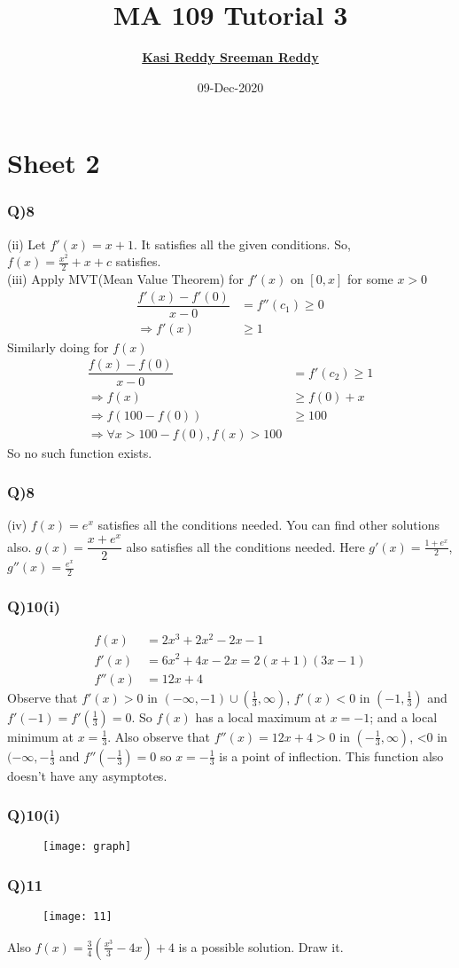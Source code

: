 \documentclass[11pt]{beamer}
\author[K. Sreeman Reddy]{\href{http://iamsreeman.github.io/}{\textbf{Kasi Reddy Sreeman Reddy}}\linebreak\text{2nd year physics student}\linebreak\text{\href{http://iamsreeman.github.io/MA109}{http://iamsreeman.github.io/MA109}}}
\title{MA 109 Tutorial 3}
\institute[]{IIT Bombay}
\date{09-Dec-2020}
\begin{document}
\begin{frame}
\titlepage
\end{frame}


\section{Sheet 2}
\begin{frame}
\frametitle{Q)8}
(ii) Let $f'(x)=x+1$. It satisfies all the given conditions. So, $f(x)=\frac{x^2}{2}+x+c$ satisfies.\\
(iii) Apply MVT(Mean Value Theorem) for $f'(x)$ on $[0,x]$ for some $x>0$
\begin{align*}
\dfrac{f'(x)-f'(0)}{x-0}&=f''(c_1)\geq 0\\
\Rightarrow f'(x)&\geq 1
\end{align*}
Similarly doing for $f(x)$
\begin{align*}
\dfrac{f(x)-f(0)}{x-0}&=f'(c_2)\geq 1\\
\Rightarrow f(x)&\geq f(0)+x\\
\Rightarrow f(100-f(0))&\geq 100\\
\Rightarrow \forall x >100-f(0), f(x)>100
\end{align*}
So no such function exists.
\end{frame}
\begin{frame}
\frametitle{Q)8}
(iv) $f(x)=e^x$ satisfies all the conditions needed. You can find other solutions also. $g(x)=\dfrac{x+e^x}{2}$ also satisfies all the conditions needed. Here $g'(x)=\frac{1+e^x}{2}$, $g''(x)=\frac{e^x}{2}$
\end{frame}
\begin{frame}
\frametitle{Q)10(i)}
\begin{align*}
f(x)&=2x^{3}+2x^{2}-2x-1\\
f'(x)&=6x^{2}+4x-2x=2(x+1)(3x-1)\\
f''(x)&=12x+4
\end{align*}
Observe that $f'(x)>0$ in $(-\infty,-1)\cup (\frac{1}{3},\infty)$, $f'(x)<0$ in $(-1,\frac{1}{3})$ and $f'(-1)=f'(\frac{1}{3})=0$. So $f(x)$ has a local maximum at $x = -1$; and a local minimum at $x =\frac{1}{3}$. Also observe that $f''(x) = 12x + 4>0$ in $(-\frac{1}{3},\infty)$, <0 in $(-\infty,-\frac{1}{3}$ and $f''(-\frac{1}{3})=0$ so $x=-\frac{1}{3}$ is a point of inflection. This function also doesn't have any asymptotes.
\end{frame}
\begin{frame}
\frametitle{Q)10(i)}
\begin{figure}[t]
\texttt{[image: graph]}
\centering
\end{figure}
\end{frame}
\begin{frame}
\frametitle{Q)11}
\begin{figure}[t]
\texttt{[image: 11]}
\centering
\end{figure}
Also $f(x)=\frac{3}{4}(\frac{x^3}{3}-4x)+4$ is a possible solution. Draw it.
\end{frame}
\end{document}
